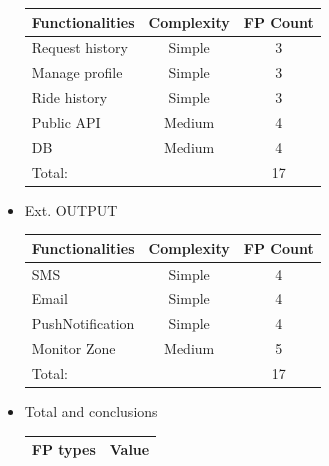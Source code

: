 \documentclass[a4paper,11pt]{report} %
\begin{document}
\begin{itemize}
\begin{center}
\begin{tabular}{| p{7cm} | p{2.5cm} | p{2cm} |}
						\textbf{Functionalities} & \multicolumn{1}{|c|}{\textbf{Complexity}} & \textbf{FP Count}\\\hline
						Request history & \multicolumn{1}{|c|}{Simple} & \multicolumn{1}{|c|}{3}\\\hline
						Manage profile & \multicolumn{1}{|c|}{Simple} & \multicolumn{1}{|c|}{3}\\\hline
						Ride history & \multicolumn{1}{|c|}{Simple} & \multicolumn{1}{|c|}{3}\\\hline		
						Public API & \multicolumn{1}{|c|}{Medium} & \multicolumn{1}{|c|}{4}\\\hline	
						DB & \multicolumn{1}{|c|}{Medium} & \multicolumn{1}{|c|}{4}\\\hline		

						\multicolumn{2}{|l|}{Total:} & \multicolumn{1}{|c|}{17}\\\hline
					\end{tabular}
				\end{center}
				\item Ext. OUTPUT
				\renewcommand{\arraystretch}{1.2}
				\setlength{\tabcolsep}{12pt}
				\begin{center}
					\begin{tabular}{| p{7cm} | p{2.5cm} | p{2cm} |}\hline
						\textbf{Functionalities} & \multicolumn{1}{|c|}{\textbf{Complexity}} & \textbf{FP Count}\\\hline
						SMS & \multicolumn{1}{|c|}{Simple} & \multicolumn{1}{|c|}{4}\\\hline
						Email & \multicolumn{1}{|c|}{Simple} & \multicolumn{1}{|c|}{4}\\\hline
						PushNotification & \multicolumn{1}{|c|}{Simple} & \multicolumn{1}{|c|}{4}\\\hline		
						Monitor Zone & \multicolumn{1}{|c|}{Medium} & \multicolumn{1}{|c|}{5}\\\hline																						
						\multicolumn{2}{|l|}{Total:} & \multicolumn{1}{|c|}{17}\\\hline
					\end{tabular}
				\end{center}
				\pagebreak
				\item Total and conclusions
				\renewcommand{\arraystretch}{1.2}
				\setlength{\tabcolsep}{12pt}
				\begin{center}
					\begin{tabular}{| p{7cm} | p{2cm} |}\hline
						\textbf{FP types} & \multicolumn{1}{|c|}{\textbf{Value}}\\\hline

\end{tabular}
\end{center}
\end{itemize}
\end{document}

